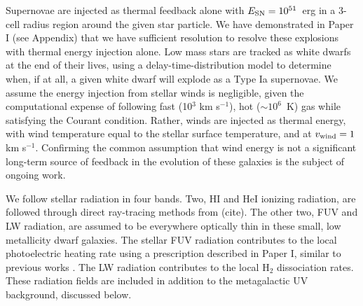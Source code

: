 \documentclass[twocolumn]{aastex61}
\begin{document}
Supernovae are injected as thermal feedback alone with $E_{\rm SN} = 10^{51}$~erg in a 3-cell radius region around the given star particle. We have demonstrated in Paper I (see Appendix) that we have sufficient resolution to resolve these explosions with thermal energy injection alone. Low mass stars are tracked as white dwarfs at the end of their lives, using a delay-time-distribution model to determine when, if at all, a  given white dwarf will explode as a Type Ia supernovae. We assume the energy injection from stellar winds is negligible, given the computational expense of following fast (10$^{3}$ km s$^{-1}$), hot ($\sim 10^{6}$~K) gas while satisfying the Courant condition. Rather, winds are injected as thermal energy, with wind temperature equal to the stellar surface temperature, and at $v_{\rm wind} = 1$ km s$^{-1}$. Confirming the common assumption that wind energy is not a significant long-term source of feedback in the evolution of these galaxies is the subject of ongoing work.

We follow stellar radiation in four bands. Two, HI and HeI ionizing radiation, are followed through direct ray-tracing methods from (cite). The other two, FUV and LW radiation, are assumed to be everywhere optically thin in these small, low metallicity dwarf galaxies. The stellar FUV radiation contributes to the local photoelectric heating rate using a prescription described in Paper I, similar to previous works \cite{BakesTielens1994,Wolfire2003,Forbes2016,Hu2017}. The LW radiation contributes to the local H$_{2}$ dissociation rates. These radiation fields are included in addition to the metagalactic UV background, discussed below.


\end{document}
